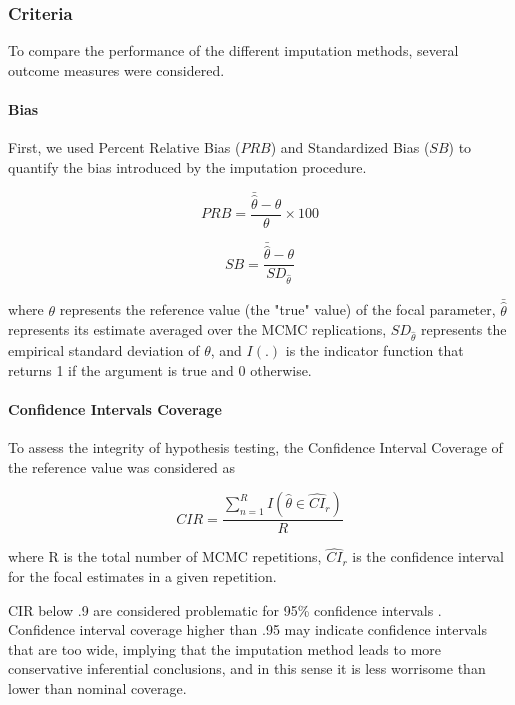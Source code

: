 \subsubsection{Criteria} \label{criteria}
	To compare the performance of the different imputation methods, several outcome measures were considered.

	\paragraph{Bias}

	First, we used Percent Relative Bias ($PRB$) and Standardized Bias ($SB$) to quantify the bias introduced by the imputation
	procedure.

	\begin{equation} \label{eqn:prb}
		PRB = \frac{\bar{\hat{\theta}} - \theta}{\theta} \times 100
	\end{equation}

	\begin{equation} \label{eqn:sb}
		SB =  \frac{\bar{\hat{\theta}} - \theta}{SD_{\hat{\theta}}}
	\end{equation}
	
	where $\theta$ represents the reference value (the "true" value) of the focal parameter, 
	$\bar{\hat{\theta}}$ represents its estimate averaged over the MCMC replications, 
	$SD_{\hat{\theta}}$ represents the empirical standard deviation of $\theta$, 
	and $I(.)$ is the indicator function that returns 1 if the argument is true and 0 otherwise. 

	\paragraph{Confidence Intervals Coverage}
	To assess the integrity of hypothesis testing, the Confidence Interval Coverage of the reference value
	was considered as

	\begin{equation} \label{eqn:sb}
		CIR =  \frac{ \sum_{n=1}^{R} I(\hat{\theta} \in \widehat{CI}_r ) }{R}
	\end{equation}

	where R is the total number of MCMC repetitions, $\hat{CI}_r$ is the confidence interval for the focal estimates
	in a given repetition.

	CIR below .9 are considered problematic for 95\% confidence intervals \cite[p. 52]{vanBuuren:2018}.
	Confidence interval coverage higher than .95 may indicate confidence intervals that are too wide, implying that
	the imputation method leads to more conservative inferential conclusions, and in this sense it is less worrisome 
	than lower than nominal coverage.

